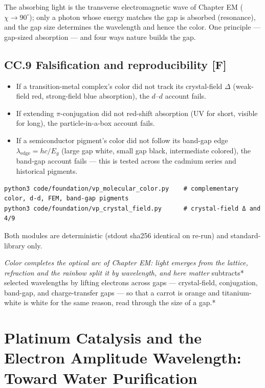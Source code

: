 \documentclass[
  10pt,
]{article}
\providecommand{\tightlist}{%
  \setlength{\itemsep}{0pt}\setlength{\parskip}{0pt}}
\begin{document}
The absorbing light is the transverse electromagnetic wave of Chapter EM
(\(\chi\to 90^\circ\)); only a photon whose energy matches the gap is
absorbed (resonance), and the gap size determines the wavelength and
hence the color. One principle --- gap-sized absorption --- and four
ways nature builds the gap.

\hypertarget{cc.9-falsification-and-reproducibility-f}{%
\subsection{\texorpdfstring{CC.9 Falsification and reproducibility
\textbf{{[}F{]}}}{CC.9 Falsification and reproducibility {[}F{]}}}\label{cc.9-falsification-and-reproducibility-f}}

\begin{itemize}
\tightlist
\item
  If a transition-metal complex's color did not track its crystal-field
  \(\Delta\) (weak-field red, strong-field blue absorption), the
  \(d\)--\(d\) account fails.
\item
  If extending \(\pi\)-conjugation did not red-shift absorption (UV for
  short, visible for long), the particle-in-a-box account fails.
\item
  If a semiconductor pigment's color did not follow its band-gap edge
  \(\lambda_{\text{edge}} = hc/E_g\) (large gap white, small gap black,
  intermediate colored), the band-gap account fails --- this is tested
  across the cadmium series and historical pigments.
\end{itemize}

\begin{verbatim}
python3 code/foundation/vp_molecular_color.py    # complementary color, d-d, FEM, band-gap pigments
python3 code/foundation/vp_crystal_field.py      # crystal-field Δ and 4/9
\end{verbatim}

Both modules are deterministic (stdout sha256 identical on re-run) and
standard-library only.

\emph{Color completes the optical arc of Chapter EM: light emerges from
the lattice, refraction and the rainbow split it by wavelength, and here
matter }subtracts* selected wavelengths by lifting electrons across gaps
--- crystal-field, conjugation, band-gap, and charge-transfer gaps ---
so that a carrot is orange and titanium-white is white for the same
reason, read through the size of a gap.*

\hypertarget{platinum-catalysis-and-the-electron-amplitude-wavelength-toward-water-purification}{%
\section{Platinum Catalysis and the Electron Amplitude Wavelength:
Toward Water
Purification}\label{platinum-catalysis-and-the-electron-amplitude-wavelength-toward-water-purification}}
\end{document}
